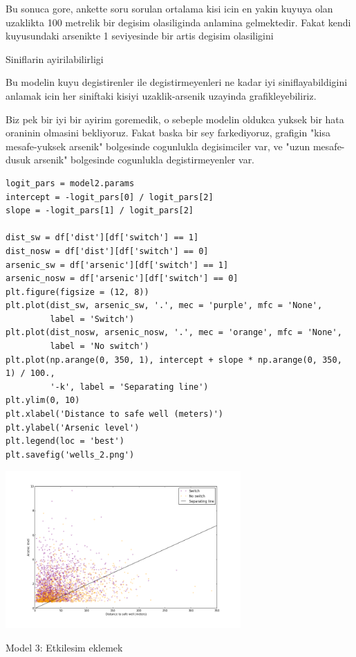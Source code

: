 \documentclass[12pt,fleqn]{article}\usepackage{../common}
\begin{document}
Bu sonuca gore, ankette soru sorulan ortalama kisi icin en yakin
kuyuya olan uzaklikta 100 metrelik bir degisim olasiliginda %
anlamina gelmektedir. Fakat kendi kuyusundaki arsenikte 1 seviyesinde
bir artis degisim olasiligini %

Siniflarin ayirilabilirligi

Bu modelin kuyu degistirenler ile degistirmeyenleri ne kadar iyi
siniflayabildigini anlamak icin her siniftaki kisiyi uzaklik-arsenik
uzayinda grafikleyebiliriz.

Biz pek bir iyi bir ayirim goremedik, o sebeple modelin oldukca yuksek
bir hata oraninin olmasini bekliyoruz. Fakat baska bir sey farkediyoruz,
grafigin "kisa mesafe-yuksek arsenik" bolgesinde cogunlukla degisimciler var,
ve "uzun mesafe-dusuk arsenik" bolgesinde cogunlukla degistirmeyenler var.

\begin{verbatim}
logit_pars = model2.params
intercept = -logit_pars[0] / logit_pars[2]
slope = -logit_pars[1] / logit_pars[2]

dist_sw = df['dist'][df['switch'] == 1]
dist_nosw = df['dist'][df['switch'] == 0]
arsenic_sw = df['arsenic'][df['switch'] == 1]
arsenic_nosw = df['arsenic'][df['switch'] == 0]
plt.figure(figsize = (12, 8))
plt.plot(dist_sw, arsenic_sw, '.', mec = 'purple', mfc = 'None', 
         label = 'Switch')
plt.plot(dist_nosw, arsenic_nosw, '.', mec = 'orange', mfc = 'None', 
         label = 'No switch')
plt.plot(np.arange(0, 350, 1), intercept + slope * np.arange(0, 350, 1) / 100.,
         '-k', label = 'Separating line')
plt.ylim(0, 10)
plt.xlabel('Distance to safe well (meters)')
plt.ylabel('Arsenic level')
plt.legend(loc = 'best')
plt.savefig('wells_2.png')
\end{verbatim}

\includegraphics[height=6cm]{wells_2.png}

Model 3: Etkilesim eklemek
\end{document}
